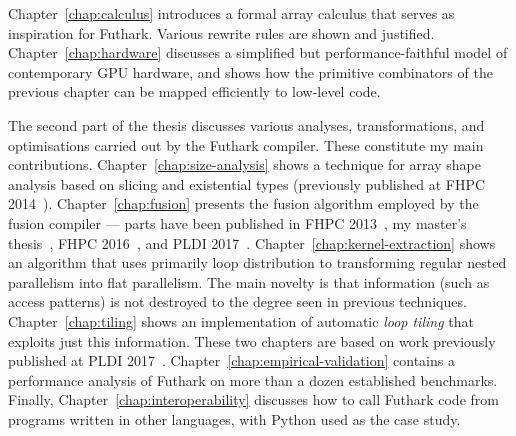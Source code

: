 Chapter~\ref{chap:calculus} introduces a formal array calculus that
serves as inspiration for Futhark.  Various rewrite rules are shown
and justified.  Chapter~\ref{chap:hardware} discusses a simplified but
performance-faithful model of contemporary GPU hardware, and shows
how the primitive combinators of the previous chapter can be mapped
efficiently to low-level code.

The second part of the thesis discusses various analyses,
transformations, and optimisations carried out by the Futhark
compiler.  These constitute my main contributions.
Chapter~\ref{chap:size-analysis} shows a technique for array shape
analysis based on slicing and existential types (previously published
at FHPC 2014~\cite{henriksen2014size}).  Chapter~\ref{chap:fusion}
presents the fusion algorithm employed by the fusion compiler ---
parts have been published in FHPC 2013~\cite{henriksen2013t2}, my
master's thesis~\cite{henriksen2014exploiting}, FHPC
2016~\cite{Futhark:redomap}, and PLDI
2017~\cite{henriksen2017futhark}.
Chapter~\ref{chap:kernel-extraction} shows an algorithm that uses
primarily loop distribution to transforming regular nested parallelism
into flat parallelism.  The main novelty is that information (such as
access patterns) is not destroyed to the degree seen in previous
techniques.  Chapter~\ref{chap:tiling} shows an implementation of
automatic \textit{loop tiling} that exploits just this information.
These two chapters are based on work previously published at PLDI
2017~\cite{henriksen2017futhark}.
Chapter~\ref{chap:empirical-validation} contains a performance
analysis of Futhark on more than a dozen established benchmarks.
Finally, Chapter~\ref{chap:interoperability} discusses how to call
Futhark code from programs written in other languages, with Python
used as the case study.

